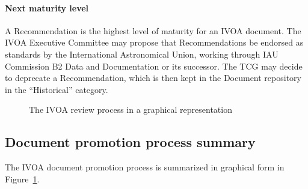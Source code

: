 \documentclass[11pt,a4paper]{ivoa}
\begin{document}
\paragraph{Next maturity level}  A Recommendation is the highest level of maturity
for an IVOA document.  The IVOA Executive Committee may propose that
Recommendations be endorsed as standards by the International
Astronomical Union, working through IAU Commission B2 Data and
Documentation or its successor. The TCG may decide to deprecate a
Recommendation, which is then kept in the Document repository in the
“Historical” category.

\begin{figure}
\caption{The IVOA review process in a graphical representation}
\label{fig:procsummary}
\end{figure}

\subsection{Document promotion process summary}

The IVOA document promotion process is summarized in graphical form in
Figure~\ref{fig:procsummary}.
\end{document}
